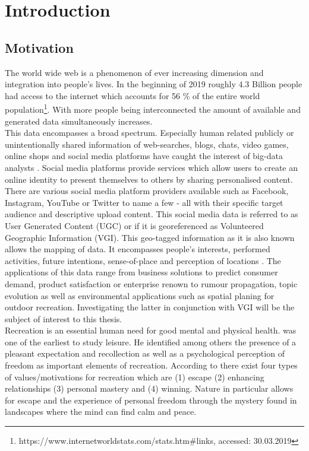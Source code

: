 \chapter{Introduction}
\section{Motivation}
The world wide web is a phenomenon of ever increasing dimension and integration into people's lives. In the beginning of 2019 roughly 4.3 Billion people had access to the internet which accounts for 56 \% of the entire world population\footnote{https://www.internetworldstats.com/stats.htm\#links, accessed: 30.03.2019}. 
With more people being interconnected the amount of available and generated data simultaneously increases.\\
This data encompasses a broad spectrum. Especially human related publicly or unintentionally shared information of web-searches, blogs, chats, video games, online shops and social media platforms have caught the interest of big-data analysts \parencite{Wu2014}. Social media platforms provide services which allow users to create an online identity to present themselves to others by sharing personalised content. There are various social media platform providers available such as Facebook, Instagram, YouTube or Twitter to name a few - all with their specific target audience and descriptive upload content. This social media data is referred to as User Generated Content (UGC) or if it is georeferenced as Volunteered Geographic Information (VGI). This geo-tagged information as it is also known allows the mapping of data. It encompasses people's interests, performed activities, future intentions, sense-of-place and perception of locations \parencite{Goodchild2007}. The applications of this data range from business solutions to predict consumer demand, product satisfaction or enterprise renown \parencite{Yang2019} to rumour propagation, topic evolution \parencite{Kazienko2015} as well as environmental applications such as spatial planing for outdoor recreation. Investigating the latter in conjunction with VGI will be the subject of interest to this thesis.\\
Recreation is an essential human need for good mental \parencite{Trenberth2002} and physical health. \textcite{Kaplan1960} was one of the earliest to study leisure. He identified among others the presence of a pleasant expectation and recollection as well as a psychological perception of freedom as important elements of recreation. According to \textcite{Dillard2011} there exist four types of values/motivations for recreation which are (1) escape (2) enhancing relationships (3) personal mastery and (4) winning. Nature in particular allows for escape and the experience of personal freedom through the mystery found in landscapes \parencite{Kaplan1989} where the mind can find calm and peace. \\
